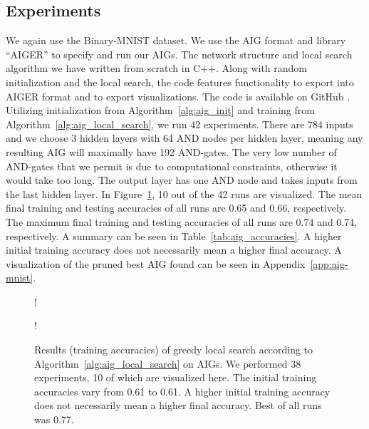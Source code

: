 \subsection{Experiments}
We again use the Binary-MNIST dataset. We use the AIG format and library \enquote{AIGER} \cite{bib:Biere-FMV-TR-07-1} to specify and run our AIGs. The network structure and local search algorithm we have written from scratch in C++. Along with random initialization and the local search, the code features functionality to export into AIGER format and to export visualizations. The code is available on GitHub \cite{bib:aig_github}. Utilizing initialization from Algorithm~\ref{alg:aig_init} and training from Algorithm~\ref{alg:aig_local_search}, we run 42 experiments. There are 784 inputs and we choose 3 hidden layers with 64 AND nodes per hidden layer, meaning any resulting AIG will maximally have 192 AND-gates. The very low number of AND-gates that we permit is due to computational constraints, otherwise it would take too long. The output layer has one AND node and takes inputs from the last hidden layer. In Figure~\ref{fig:aig_exp_result}, 10 out of the 42 runs are visualized. The mean final training and testing accuracies of all runs are 0.65 and 0.66, respectively. The maximum final training and testing accuracies of all runs are 0.74 and 0.74, respectively. A summary can be seen in Table~\ref{tab:aig_accuracies}. A higher initial training accuracy does not necessarily mean a higher final accuracy. A visualization of the pruned best AIG found can be seen in Appendix~\ref{app:aig-mnist}.

\begin{figure}[!htb]
    \centering
  \begin{minipage}[b]{.49\linewidth}
    \resizebox {1\textwidth} {!} {
    
    }
    \label{fig:aix_exp_result:train}
  \end{minipage}
  \begin{minipage}[b]{.49\linewidth}
    \resizebox {1\textwidth} {!} {
    
    }
    \label{fig:aig_exp_result:test}
  \end{minipage}
  \caption{Results (training accuracies) of greedy local search according to Algorithm~\ref{alg:aig_local_search} on AIGs. We performed 38 experiments, 10 of which are visualized here. The initial training accuracies vary from 0.61 to 0.61. A higher initial training accuracy does not necessarily mean a higher final accuracy. Best of all runs was 0.77.}
\label{fig:aig_exp_result}
\end{figure}
\FloatBarrier

